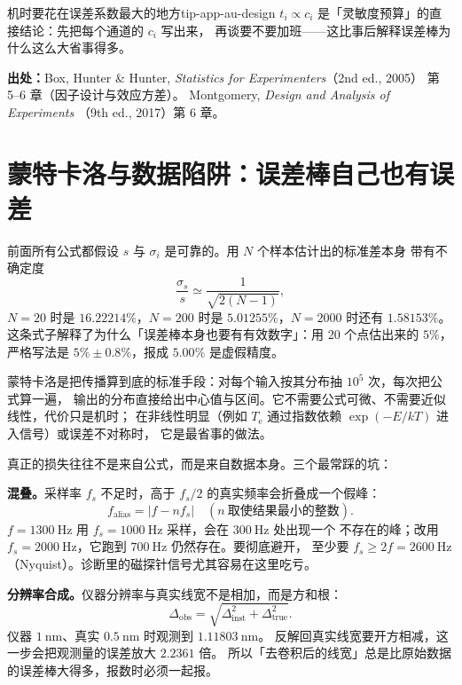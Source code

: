 \begin{tip}{机时要花在误差系数最大的地方}{tip-app-au-design}
$t_i\propto c_i$ 是「灵敏度预算」的直接结论：先把每个通道的 $c_i$ 写出来，
再谈要不要加班——这比事后解释误差棒为什么这么大省事得多。
\end{tip}

{\small

\textbf{出处：}Box, Hunter \& Hunter, \emph{Statistics for Experimenters}（2nd ed., 2005）
第 5--6 章（因子设计与效应方差）。
Montgomery, \emph{Design and Analysis of Experiments}
（9th ed., 2017）第 6 章。
}

\section{蒙特卡洛与数据陷阱：误差棒自己也有误差}
\label{sec:app-au-mc}

前面所有公式都假设 $s$ 与 $\sigma_i$ 是可靠的。用 $N$ 个样本估计出的标准差本身
带有不确定度
\begin{equation}
\frac{\sigma_s}{s}\simeq\frac{1}{\sqrt{2(N-1)}} ,
\label{eq:app-au-mc}
\end{equation}
$N=20$ 时是 $16.22214\%$，$N=200$ 时是 $5.01255\%$，$N=2000$ 时还有 $1.58153\%$。
这条式子解释了为什么「误差棒本身也要有有效数字」：用 20 个点估出来的 $5\%$，
严格写法是 $5\%\pm0.8\%$，报成 $5.00\%$ 是虚假精度。

蒙特卡洛是把传播算到底的标准手段：对每个输入按其分布抽 $10^5$ 次，每次把公式算一遍，
输出的分布直接给出中心值与区间。它不需要公式可微、不需要近似线性，代价只是机时；
在非线性明显（例如 $T_\mathrm{e}$ 通过指数依赖 $\exp(-E/kT)$ 进入信号）或误差不对称时，
它是最省事的做法。

真正的损失往往不是来自公式，而是来自数据本身。三个最常踩的坑：

\textbf{混叠。}采样率 $f_s$ 不足时，高于 $f_s/2$ 的真实频率会折叠成一个假峰：
\begin{equation}
f_\mathrm{alias}=\left|f-n f_s\right| \quad (n\ \text{取使结果最小的整数}).
\label{eq:app-au-alias}
\end{equation}
$f=1300\ \mathrm{Hz}$ 用 $f_s=1000\ \mathrm{Hz}$ 采样，会在 $300\ \mathrm{Hz}$ 处出现一个
不存在的峰；改用 $f_s=2000\ \mathrm{Hz}$，它跑到 $700\ \mathrm{Hz}$ 仍然存在。要彻底避开，
至少要 $f_s\ge2f=2600\ \mathrm{Hz}$（Nyquist）。诊断里的磁探针信号尤其容易在这里吃亏。

\textbf{分辨率合成。}仪器分辨率与真实线宽不是相加，而是方和根：
\begin{equation}
\Delta_\mathrm{obs}=\sqrt{\Delta_\mathrm{inst}^2+\Delta_\mathrm{true}^2}.
\label{eq:app-au-deconv}
\end{equation}
仪器 $1\ \mathrm{nm}$、真实 $0.5\ \mathrm{nm}$ 时观测到 $1.11803\ \mathrm{nm}$。
反解回真实线宽要开方相减，这一步会把观测量的误差放大 $2.2361$ 倍。
所以「去卷积后的线宽」总是比原始数据的误差棒大得多，报数时必须一起报。

